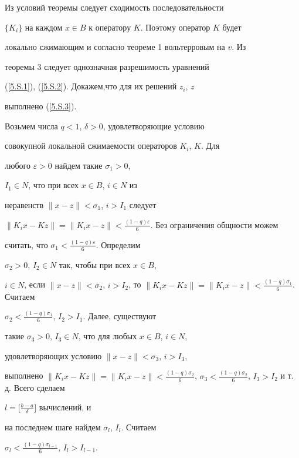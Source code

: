 \begin{pf}


Из условий теоремы следует сходимость последовательности


$\{K_i\}$ на каждом $x\in B$ к оператору $K$. Поэтому оператор $K$ будет


локально сжимающим и согласно теореме 1 вольтерровым на $v$. Из


теоремы 3 следует однозначная разрешимость уравнений


(\ref{5.S.1}), (\ref{5.S.2}). Докажем,что для их решений $z_i$, $z$


выполнено (\ref{5.S.3}).





Возьмем числа $q<1$, $\delta>0$, удовлетворяющие условию


совокупной локальной сжимаемости операторов $K_i$, $K$. Для


любого $\varepsilon>0$ найдем такие $\sigma_1>0$,


$I_1 \in N$, что при всех $x\in B$, $i\in N $ из


неравенств $\|x-z\|< \sigma_{1}$, $i>I_1$ следует


$\|K_i x-K z\| =\|K_i x- z\| <


\frac{(1-q)\varepsilon}{6}$. Без ограничения общности можем


считать, что $\sigma_1 <\frac{(1-q)\varepsilon}{6}$. Определим


$\sigma_2>0$, $I_2 \in N$ так, чтобы при всех $x\in B$,


$i\in N$, если $\|x-z\|<\sigma_{2}$, $i>I_2$, то $\|K_i x-K z\|


=\|K_i x- z\| < \frac{(1-q)\sigma_1}{6}$. Считаем


$\sigma_2 < \frac{(1-q)\sigma_1}{6}$, $I_2>I_1$. Далее, существуют 


такие $\sigma_3>0$, $I_3 \in N$, что для любых $x\in B$, $i\in N$,


удовлетворяющих условию $\|x-z\|< \sigma_{3}$, $ i>I_3$,


выполнено $\|K_i x-K z\| =\|K_i x- z\| <


\frac{(1-q)\sigma_2}{6}$, $\sigma_3 <


\frac{(1-q)\sigma_2}{6}$, $I_3>I_2$ и т.\,д. Всего сделаем


$l=\big[\frac{b-a}{\delta}\big]$ вычислений, и


на последнем шаге найдем $\sigma_l$, $I_l$. Считаем


$\sigma_l < \frac{(1-q)\sigma_{l-1}}{6}$, $I_l>I_{l-1}$.






\end{pf}
